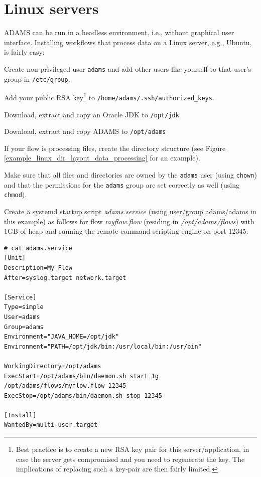 \section{Linux servers}
ADAMS can be run in a headless environment, i.e., without graphical user
interface. Installing workflows that process data on a Linux server, e.g.,
Ubuntu, is fairly easy:
\begin{tight_itemize}
  \item Create non-privileged user \texttt{adams} and add other users like
  yourself to that user's group in \texttt{/etc/group}.
  \item Add your public RSA key\footnote{Best practice is to create a new
  RSA key pair for this server/application, in case the server gets compromised
  and you need to regenerate the key. The implications of replacing such a
  key-pair are then fairly limited.} to \texttt{/home/adams/.ssh/authorized\_keys}.
  \item Download, extract and copy an Oracle JDK to \texttt{/opt/jdk}
  \item Download, extract and copy ADAMS to \texttt{/opt/adams}
  \item If your flow is processing files, create the directory structure
  (see Figure \ref{example_linux_dir_layout_data_processing} for an example).
  \item Make sure that all files and directories are owned by the \texttt{adams}
  user (using \texttt{chown}) and that the permissions for the \texttt{adams}
  group are set correctly as well (using \texttt{chmod}).
  \item Create a systemd startup script \textit{adams.service}
  (using user/group adams/adams in this example) as follows for flow
  \textit{myflow.flow} (residing in \textit{/opt/adams/flows}) with 1GB of
  heap and running the remote command scripting engine on port 12345:
    {\scriptsize \begin{verbatim}
# cat adams.service
[Unit]
Description=My Flow
After=syslog.target network.target

[Service]
Type=simple
User=adams
Group=adams
Environment="JAVA_HOME=/opt/jdk"
Environment="PATH=/opt/jdk/bin:/usr/local/bin:/usr/bin"

WorkingDirectory=/opt/adams
ExecStart=/opt/adams/bin/daemon.sh start 1g /opt/adams/flows/myflow.flow 12345
ExecStop=/opt/adams/bin/daemon.sh stop 12345

[Install]
WantedBy=multi-user.target
    \end{verbatim}}
\end{tight_itemize}

